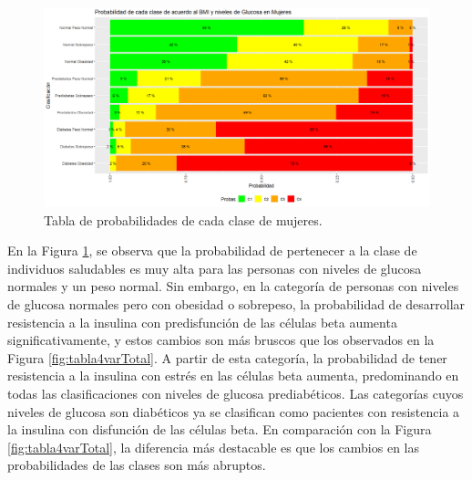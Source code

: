 \begin{figure}[H]
    \centering
    \includegraphics[height = 10 cm, width = 0.9 \textwidth]{4img/tablaM.png}
    \caption{Tabla de probabilidades de cada clase de mujeres.}
    \label{fig:tabMujeres}
\end{figure}

En la Figura \ref{fig:tabMujeres}, se observa que la probabilidad de pertenecer a la clase de individuos saludables es muy alta para las personas con niveles de glucosa normales y un peso normal. Sin embargo, en la categoría de personas con niveles de glucosa normales pero con obesidad o sobrepeso, la probabilidad de desarrollar resistencia a la insulina con predisfunción de las células beta aumenta significativamente, y estos cambios son más bruscos que los observados en la Figura \ref{fig:tabla4varTotal}. A partir de esta categoría, la probabilidad de tener resistencia a la insulina con estrés en las células beta aumenta, predominando en todas las clasificaciones con niveles de glucosa prediabéticos. Las categorías cuyos niveles de glucosa son diabéticos ya se clasifican como pacientes con resistencia a la insulina con disfunción de las células beta. En comparación con la Figura  \ref{fig:tabla4varTotal}, la diferencia más destacable es que los cambios en las probabilidades de las clases son más abruptos. 




